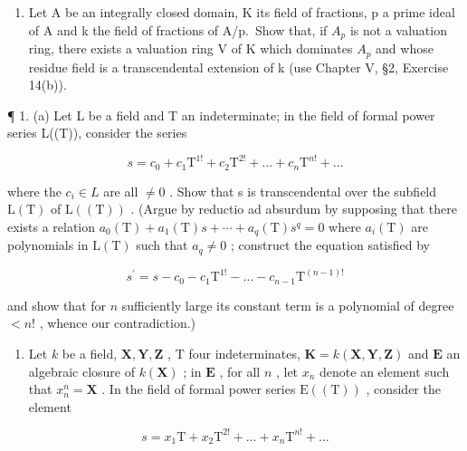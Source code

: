 \begin{enumerate}
\def\labelenumi{\arabic{enumi}.}
\setcounter{enumi}{5}
\tightlist
\item
  Let A be an integrally closed domain, K its field of fractions, p a prime ideal of A and k the field of fractions of A/p.~Show that, if \(A_{p}\) is not a valuation ring, there exists a valuation ring V of K which dominates \(A_{p}\) and whose residue field is a transcendental extension of k (use Chapter V, §2, Exercise 14(b)).
\end{enumerate}


¶ 1. (a) Let L be a field and T an indeterminate; in the field of formal power series L((T)), consider the series

\[
s = c _ {0} + c _ {1} \mathrm{T} ^ {1!} + c _ {2} \mathrm{T} ^ {2!} + \dots + c _ {n} \mathrm{T} ^ {n!} + \dots
\]

where the \(c_{i} \in L\) are all \(\neq 0\) . Show that s is transcendental over the subfield \(\mathrm{L}(\mathrm{T})\) of \(\mathrm{L}((\mathrm{T}))\) . (Argue by reductio ad absurdum by supposing that there exists a relation \(a_{0}(\mathrm{T}) + a_{1}(\mathrm{T})s + \cdots + a_{q}(\mathrm{T})s^{q} = 0\) where \(a_{i}(\mathrm{T})\) are polynomials in \(\mathrm{L}(\mathrm{T})\) such that \(a_{q} \neq 0\) ; construct the equation satisfied by

\[
s ^ {\prime} = s - c _ {0} - c _ {1} \mathrm{T} ^ {1!} - \dots - c _ {n - 1} \mathrm{T} ^ {(n - 1)!}
\]

and show that for \(n\) sufficiently large its constant term is a polynomial of degree \(< n!\) , whence our contradiction.)

\begin{enumerate}
\def\labelenumi{(\alph{enumi})}
\setcounter{enumi}{1}
\tightlist
\item
  Let \(k\) be a field, \(\mathbf{X}, \mathbf{Y}, \mathbf{Z}\) , \(\mathrm{T}\) four indeterminates, \(\mathbf{K} = k(\mathbf{X}, \mathbf{Y}, \mathbf{Z})\) and \(\mathbf{E}\) an algebraic closure of \(k(\mathbf{X})\) ; in \(\mathbf{E}\) , for all \(n\) , let \(x_{n}\) denote an element such that \(x_{n}^{n} = \mathbf{X}\) . In the field of formal power series \(\mathrm{E}((\mathrm{T}))\) , consider the element
\end{enumerate}

\[
s = x _ {1} \mathrm{T} + x _ {2} \mathrm{T} ^ {2!} + \dots + x _ {n} \mathrm{T} ^ {n!} + \dots
\]

